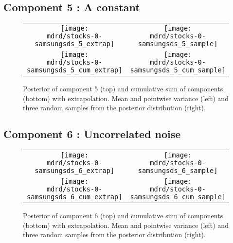 \documentclass{article} %
\begin{document}
\subsection{Component 5 : A constant}



\begin{figure}[H]
\newcommand{\wmgd}{0.5\columnwidth}
\newcommand{\hmgd}{3.0cm}
\newcommand{\mdrd}{stocks-0-samsungsds}
\newcommand{\mbm}{\hspace{-0.3cm}}
\begin{tabular}{cc}
\mbm \texttt{[image: \\mdrd/stocks-0-samsungsds\_5\_extrap]} & \texttt{[image: \\mdrd/stocks-0-samsungsds\_5\_sample]} \\
\mbm \texttt{[image: \\mdrd/stocks-0-samsungsds\_5\_cum\_extrap]} & \texttt{[image: \\mdrd/stocks-0-samsungsds\_5\_cum\_sample]}
\end{tabular}
\caption{Posterior of component 5 (top) and cumulative sum of components (bottom) with extrapolation. Mean and pointwise variance (left) and three random samples from the posterior distribution (right).}
\label{fig:extrap5}
\end{figure}

\subsection{Component 6 : Uncorrelated noise}



\begin{figure}[H]
\newcommand{\wmgd}{0.5\columnwidth}
\newcommand{\hmgd}{3.0cm}
\newcommand{\mdrd}{stocks-0-samsungsds}
\newcommand{\mbm}{\hspace{-0.3cm}}
\begin{tabular}{cc}
\mbm \texttt{[image: \\mdrd/stocks-0-samsungsds\_6\_extrap]} & \texttt{[image: \\mdrd/stocks-0-samsungsds\_6\_sample]} \\
\mbm \texttt{[image: \\mdrd/stocks-0-samsungsds\_6\_cum\_extrap]} & \texttt{[image: \\mdrd/stocks-0-samsungsds\_6\_cum\_sample]}
\end{tabular}
\caption{Posterior of component 6 (top) and cumulative sum of components (bottom) with extrapolation. Mean and pointwise variance (left) and three random samples from the posterior distribution (right).}
\label{fig:extrap6}
\end{figure}
\end{document}
